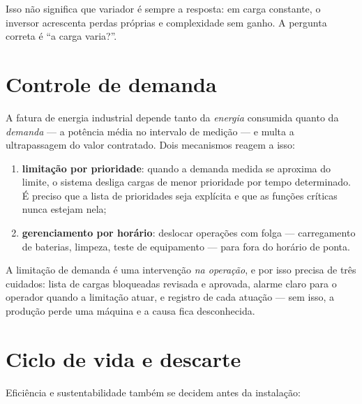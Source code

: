 Isso não significa que variador é sempre a resposta: em carga constante, o inversor acrescenta perdas
próprias e complexidade sem ganho. A pergunta correta é ``a carga varia?''.


\section{Controle de demanda}

A fatura de energia industrial depende tanto da \emph{energia} consumida quanto da \emph{demanda}
--- a potência média no intervalo de medição --- e multa a ultrapassagem do valor contratado. Dois
mecanismos reagem a isso:

\begin{enumerate}
  \item \textbf{limitação por prioridade}: quando a demanda medida se aproxima do limite, o sistema
        desliga cargas de menor prioridade por tempo determinado. É preciso que a lista de prioridades
        seja explícita e que as funções críticas nunca estejam nela;
  \item \textbf{gerenciamento por horário}: deslocar operações com folga --- carregamento de baterias,
        limpeza, teste de equipamento --- para fora do horário de ponta.
\end{enumerate}

A limitação de demanda é uma intervenção \emph{na operação}, e por isso precisa de três cuidados:
lista de cargas bloqueadas revisada e aprovada, alarme claro para o operador quando a limitação
atuar, e registro de cada atuação --- sem isso, a produção perde uma máquina e a causa fica
desconhecida.

\section{Ciclo de vida e descarte}

Eficiência e sustentabilidade também se decidem antes da instalação:

